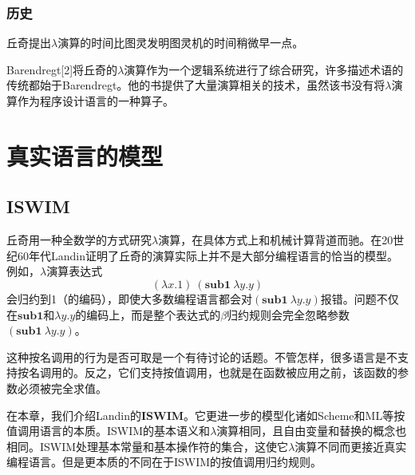 \documentclass{book}
\begin{document}
\section{历史}
丘奇提出$\lambda$演算的时间比图灵发明图灵机的时间稍微早一点。\par
Barendregt[2]将丘奇的$\lambda$演算作为一个逻辑系统进行了综合研究，许多描述术语的传统都始于Barendregt。他的书提供了大量演算相关的技术，虽然该书没有将$\lambda$演算作为程序设计语言的一种算子。
\part{真实语言的模型}
\chapter{ISWIM}
丘奇用一种全数学的方式研究$\lambda$演算，在具体方式上和机械计算背道而驰。在20世纪60年代Landin证明了丘奇的演算实际上并不是大部分编程语言的恰当的模型。例如，$\lambda$演算表达式
$$
(\lambda x.1)\ (\mathbf{sub1}\ \lambda y.y)
$$
会归约到1（的编码），即使大多数编程语言都会对$(\mathbf{sub1}\ \lambda y.y)$报错。问题不仅在$\mathbf{sub1}$和$\lambda y.y$的编码上，而是整个表达式的$\beta$归约规则会完全忽略参数$(\mathbf{sub1}\ \lambda y.y)$。\par
这种按名调用的行为是否可取是一个有待讨论的话题。不管怎样，很多语言是不支持按名调用的。反之，它们支持按值调用，也就是在函数被应用之前，该函数的参数必须被完全求值。\par
在本章，我们介绍Landin的\textbf{ISWIM}。它更进一步的模型化诸如Scheme和ML等按值调用语言的本质。ISWIM的基本语义和$\lambda$演算相同，且自由变量和替换的概念也相同。ISWIM处理基本常量和基本操作符的集合，这使它$\lambda$演算不同而更接近真实编程语言。但是更本质的不同在于ISWIM的按值调用归约规则。\par
\end{document}
